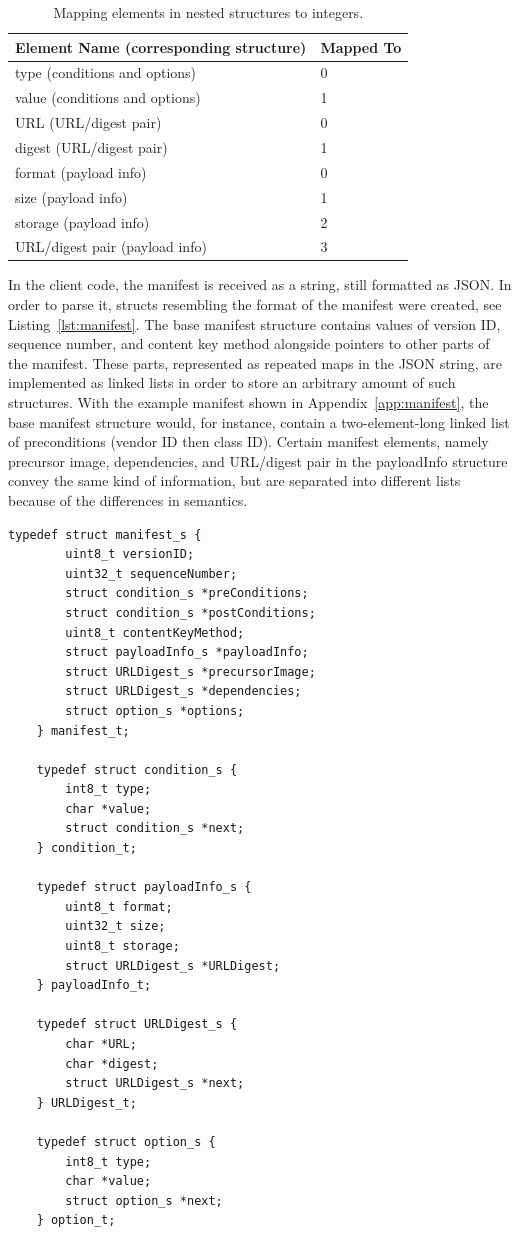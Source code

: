 \documentclass[0-thesis.tex]{subfiles}
\begin{document}
\newpage    %
\begin{longtable}[]{@{}ll@{}}
    \caption{Mapping elements in nested structures to integers.}
    \label{tab:nested-substitution}\\
    \toprule
    Element Name (corresponding structure) & Mapped To\tabularnewline
    \midrule
    \endhead
    type (conditions and options) & 0\tabularnewline
    value (conditions and options) & 1\tabularnewline
    \bottomrule
    URL (URL/digest pair) & 0\tabularnewline
    digest (URL/digest pair) & 1\tabularnewline
    \bottomrule
    format (payload info) & 0\tabularnewline
    size (payload info) & 1\tabularnewline
    storage (payload info) & 2\tabularnewline
    URL/digest pair (payload info) & 3\tabularnewline
    \bottomrule
\end{longtable}

In the client code, the manifest is received as a string, still formatted as JSON. In
order to parse it, structs resembling the format of the manifest were created, see
Listing~\ref{lst:manifest}. The base manifest structure contains values of version ID,
sequence number, and content key method alongside pointers to other parts of the manifest.
These parts, represented as repeated maps in the JSON string, are implemented as linked
lists in order to store an arbitrary amount of such structures. With the example manifest
shown in Appendix~\ref{app:manifest}, the base manifest structure would, for instance,
contain a two-element-long linked list of preconditions (vendor ID then class ID). Certain
manifest elements, namely precursor image, dependencies, and URL/digest pair in the
payloadInfo structure convey the same kind of information, but are separated into different
lists because of the differences in semantics.

\begin{lstlisting}[language=manifest, caption={The client manifest implementation.}, label=lst:manifest]
    typedef struct manifest_s {
        uint8_t versionID;
        uint32_t sequenceNumber;
        struct condition_s *preConditions;
        struct condition_s *postConditions;
        uint8_t contentKeyMethod;
        struct payloadInfo_s *payloadInfo;
        struct URLDigest_s *precursorImage;
        struct URLDigest_s *dependencies;
        struct option_s *options;
    } manifest_t;

    typedef struct condition_s {
        int8_t type;
        char *value;
        struct condition_s *next;
    } condition_t;

    typedef struct payloadInfo_s {
        uint8_t format;
        uint32_t size;
        uint8_t storage;
        struct URLDigest_s *URLDigest;
    } payloadInfo_t;

    typedef struct URLDigest_s {
        char *URL;
        char *digest;
        struct URLDigest_s *next;
    } URLDigest_t;

    typedef struct option_s {
        int8_t type;
        char *value;
        struct option_s *next;
    } option_t;
\end{lstlisting}
\end{document}

